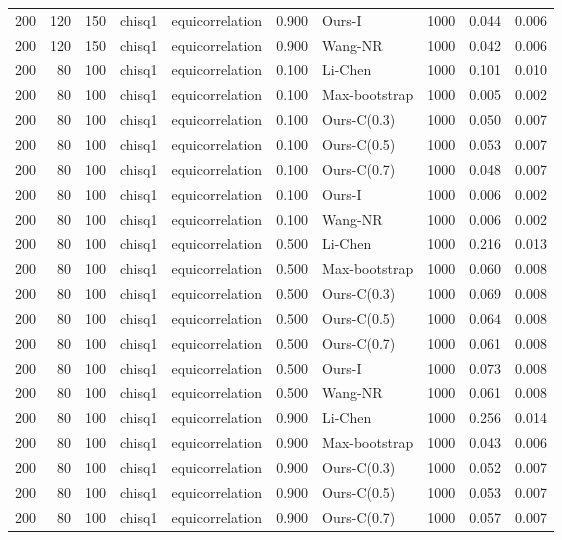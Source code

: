 \begin{tabular}{rrrllrlrrr}
200 & 120 & 150 & chisq1 & equicorrelation & 0.900 & Ours-I & 1000 & 0.044 & 0.006 \\
200 & 120 & 150 & chisq1 & equicorrelation & 0.900 & Wang-NR & 1000 & 0.042 & 0.006 \\
200 & 80 & 100 & chisq1 & equicorrelation & 0.100 & Li-Chen & 1000 & 0.101 & 0.010 \\
200 & 80 & 100 & chisq1 & equicorrelation & 0.100 & Max-bootstrap & 1000 & 0.005 & 0.002 \\
200 & 80 & 100 & chisq1 & equicorrelation & 0.100 & Ours-C(0.3) & 1000 & 0.050 & 0.007 \\
200 & 80 & 100 & chisq1 & equicorrelation & 0.100 & Ours-C(0.5) & 1000 & 0.053 & 0.007 \\
200 & 80 & 100 & chisq1 & equicorrelation & 0.100 & Ours-C(0.7) & 1000 & 0.048 & 0.007 \\
200 & 80 & 100 & chisq1 & equicorrelation & 0.100 & Ours-I & 1000 & 0.006 & 0.002 \\
200 & 80 & 100 & chisq1 & equicorrelation & 0.100 & Wang-NR & 1000 & 0.006 & 0.002 \\
200 & 80 & 100 & chisq1 & equicorrelation & 0.500 & Li-Chen & 1000 & 0.216 & 0.013 \\
200 & 80 & 100 & chisq1 & equicorrelation & 0.500 & Max-bootstrap & 1000 & 0.060 & 0.008 \\
200 & 80 & 100 & chisq1 & equicorrelation & 0.500 & Ours-C(0.3) & 1000 & 0.069 & 0.008 \\
200 & 80 & 100 & chisq1 & equicorrelation & 0.500 & Ours-C(0.5) & 1000 & 0.064 & 0.008 \\
200 & 80 & 100 & chisq1 & equicorrelation & 0.500 & Ours-C(0.7) & 1000 & 0.061 & 0.008 \\
200 & 80 & 100 & chisq1 & equicorrelation & 0.500 & Ours-I & 1000 & 0.073 & 0.008 \\
200 & 80 & 100 & chisq1 & equicorrelation & 0.500 & Wang-NR & 1000 & 0.061 & 0.008 \\
200 & 80 & 100 & chisq1 & equicorrelation & 0.900 & Li-Chen & 1000 & 0.256 & 0.014 \\
200 & 80 & 100 & chisq1 & equicorrelation & 0.900 & Max-bootstrap & 1000 & 0.043 & 0.006 \\
200 & 80 & 100 & chisq1 & equicorrelation & 0.900 & Ours-C(0.3) & 1000 & 0.052 & 0.007 \\
200 & 80 & 100 & chisq1 & equicorrelation & 0.900 & Ours-C(0.5) & 1000 & 0.053 & 0.007 \\
200 & 80 & 100 & chisq1 & equicorrelation & 0.900 & Ours-C(0.7) & 1000 & 0.057 & 0.007 \\

\end{tabular}
